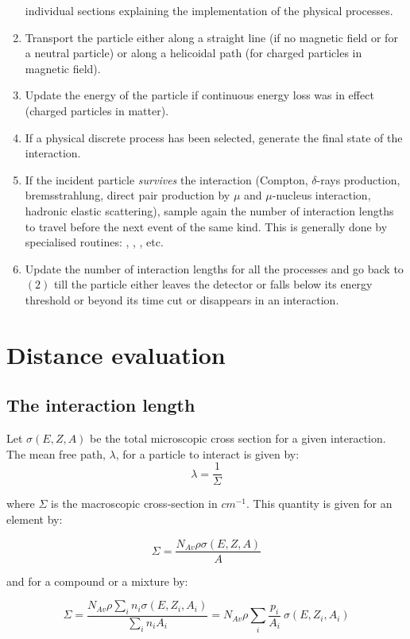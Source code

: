 \begin{enumerate}
individual sections explaining the implementation of the physical
processes.
\item Transport the particle either along a
straight line (if no magnetic field or for a
neutral particle) or along a helicoidal
path (for charged particles in magnetic field).
\item Update the energy of the particle if continuous energy loss was
in effect (charged particles in matter).
\item If a physical discrete process has been selected,
generate the final state of the interaction.
\item  If
the incident particle {\it survives} the interaction
(Compton, $\delta$-rays production, bremsstrahlung, direct pair
production by $\mu$ and $\mu$-nucleus interaction, hadronic elastic
scattering), sample
again the number of interaction lengths to travel before the next
event of the same kind. This is generally done by specialised routines:
, , , etc.
\item Update the number of interaction
lengths for all the processes and go back to $(2)$ till the particle
either leaves the detector or falls below its energy threshold or
beyond its time cut or disappears in an interaction.
\end{enumerate}
\section{Distance evaluation}
\subsection{The interaction length}
Let $\sigma(E,Z,A)$ be the total microscopic
cross section for a given interaction.
The mean free path, $\lambda$, for a particle to interact is given by:
\begin{equation}
\lambda  = \frac{1}{\Sigma}
\end{equation}
 
where $\Sigma$ is the macroscopic cross-section in $cm^{-1}$. This quantity
is given for an element by:
 
\begin{equation}
\Sigma  = \frac{N_{Av} \rho\sigma (E,Z,A)}{A}
\end{equation}
 
and for a compound or a mixture by:
 
\begin{equation}
\Sigma  = \frac{N_{Av}\rho \sum_i
          n_i\sigma(E,Z_i,A_i)}{\sum_i
          n_iA_i}
        = N_{Av} \rho \sum_i \frac{p_i}{A_i}\: \sigma(E,Z_i,A_i)
\end{equation}
 

